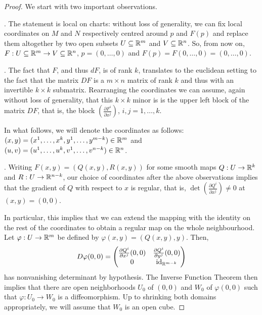 \begin{proof}
  We start with two important observations.

  . The statement is local on charts: without loss of generality,
  we can fix local coordinates on $M$ and $N$ respectively centred around $p$ and $F(p)$
  and replace them altogether by two open subsets $U\subseteq \mathbb{R}^m$ and $V \subseteq \mathbb{R}^n$.
  So, from now on, $F: U \subseteq \mathbb{R}^m \to V \subseteq \mathbb{R}^n$, $p=(0,\ldots,0)$
  and $F(p) = F(0,\ldots,0) = (0,\ldots,0)$.

  . The fact that $F$, and thus $dF$, is of rank $k$, translates to
  the euclidean setting to the fact that the matrix $DF$ is a $m\times n$ matrix of rank $k$
  and thus with an invertible $k\times k$ submatrix.
  Rearranging the coordinates we can assume, again without loss of generality, that this
  $k\times k$ minor is is the upper left block of the matrix $DF$, that is, the block
  $\left( \frac{\partial F^i}{\partial x^j} \right)$, $i,j = 1,\ldots, k$.

  In what follows, we will denote the coordinates as follows:
  $(x,y) = (x^1, \ldots, x^k, y^1, \ldots, y^{m-k})\in\mathbb{R}^m$
  and $(u,v) = (u^1, \ldots, u^k, v^1, \ldots, v^{n-k})\in\mathbb{R}^n$.
  \medskip

  .
  Writing $F(x,y) = (Q(x,y), R(x,y))$ for some smooth maps $Q: U \to \mathbb{R}^k$ and $R: U \to \mathbb{R}^{n-k}$,
  our choice of coordinates after the above observations implies that the gradient of $Q$ with respect to $x$ is regular, that is,
  $\det \left( \frac{\partial Q^i}{\partial x^j} \right) \neq 0$ at $(x,y) = (0,0)$.

  In particular, this implies that we can extend the mapping with
  the identity on the rest of the coordinates to obtain a regular map
  on the whole neighbourhood.
  Let $\varphi : U \to \mathbb{R}^m$ be defined by $\varphi(x,y) = (Q(x,y), y)$. Then,
  \begin{equation}
    D\varphi(0,0) =
    \begin{pmatrix}
      \frac{\partial Q^i}{\partial x^j}(0,0) & \frac{\partial Q^i}{\partial y^j}(0,0) \\
      0 & \operatorname{id}_{\mathbb{R}^{m-k}}
    \end{pmatrix}
  \end{equation}
  has nonvanishing determinant by hypothesis.
  The Inverse Function Theorem then implies that there are open neighborhoods $U_0$ of $(0,0)$
  and $W_0$ of $\varphi(0,0)$ such that $\varphi : U_0 \to W_0$ is a diffeomorphism.
  Up to shrinking both domains appropriately, we will assume that $W_0$ is an open cube.


\end{proof}
